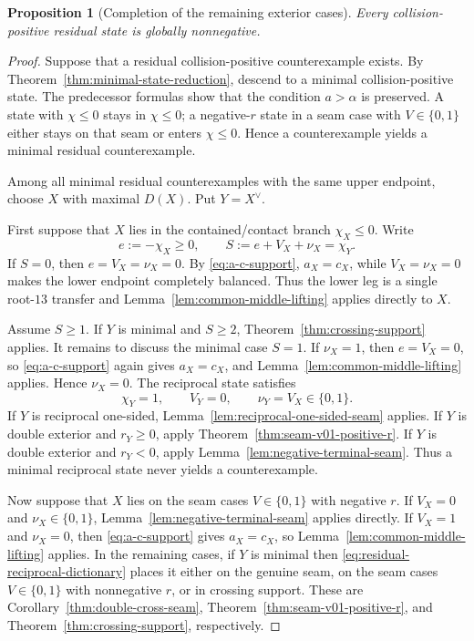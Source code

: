 \documentclass[11pt]{article}
\newtheorem{proposition}[theorem]{Proposition}
\theoremstyle{definition}
\begin{document}
\begin{proposition}[Completion of the remaining exterior cases]
\label{prop:partii-negative-r}
Every collision-positive residual state is globally nonnegative.
\end{proposition}

\begin{proof}
Suppose that a residual collision-positive counterexample exists.  By Theorem~\ref{thm:minimal-state-reduction}, descend to a minimal collision-positive state.  The predecessor formulas show that the condition \(a>\alpha\) is preserved.  A state with \(\chi\le0\) stays in \(\chi\le0\); a negative-\(r\) state in a seam case with \(V\in\{0,1\}\) either stays on that seam or enters \(\chi\le0\).  Hence a counterexample yields a minimal residual counterexample.

Among all minimal residual counterexamples with the same upper endpoint, choose \(X\) with maximal \(D(X)\).  Put \(Y=X^\vee\).

First suppose that \(X\) lies in the contained/contact branch \(\chi_X\le0\).  Write
\begin{equation*}
e:=-\chi_X\ge0,
\qquad
S:=e+V_X+\nu_X=\chi_Y.
\end{equation*}
If \(S=0\), then \(e=V_X=\nu_X=0\).  By \eqref{eq:a-c-support}, \(a_X=c_X\), while \(V_X=\nu_X=0\) makes the lower endpoint completely balanced.  Thus the lower leg is a single root-\(13\) transfer and Lemma~\ref{lem:common-middle-lifting} applies directly to \(X\).

Assume \(S\ge1\).  If \(Y\) is minimal and \(S\ge2\), Theorem~\ref{thm:crossing-support} applies.  It remains to discuss the minimal case \(S=1\).  If \(\nu_X=1\), then \(e=V_X=0\), so \eqref{eq:a-c-support} again gives \(a_X=c_X\), and Lemma~\ref{lem:common-middle-lifting} applies.  Hence \(\nu_X=0\).  The reciprocal state satisfies
\begin{equation*}
\chi_Y=1,
\qquad
V_Y=0,
\qquad
\nu_Y=V_X\in\{0,1\}.
\end{equation*}
If \(Y\) is reciprocal one-sided, Lemma~\ref{lem:reciprocal-one-sided-seam} applies.  If \(Y\) is double exterior and \(r_Y\ge0\), apply Theorem~\ref{thm:seam-v01-positive-r}.  If \(Y\) is double exterior and \(r_Y<0\), apply Lemma~\ref{lem:negative-terminal-seam}.  Thus a minimal reciprocal state never yields a counterexample.

Now suppose that \(X\) lies on the seam cases \(V\in\{0,1\}\) with negative \(r\).  If \(V_X=0\) and \(\nu_X\in\{0,1\}\), Lemma~\ref{lem:negative-terminal-seam} applies directly.  If \(V_X=1\) and \(\nu_X=0\), then \eqref{eq:a-c-support} gives \(a_X=c_X\), so Lemma~\ref{lem:common-middle-lifting} applies.  In the remaining cases, if \(Y\) is minimal then \eqref{eq:residual-reciprocal-dictionary} places it either on the genuine seam, on the seam cases \(V\in\{0,1\}\) with nonnegative \(r\), or in crossing support.  These are Corollary~\ref{thm:double-cross-seam}, Theorem~\ref{thm:seam-v01-positive-r}, and Theorem~\ref{thm:crossing-support}, respectively.


\end{proof}
\end{document}
